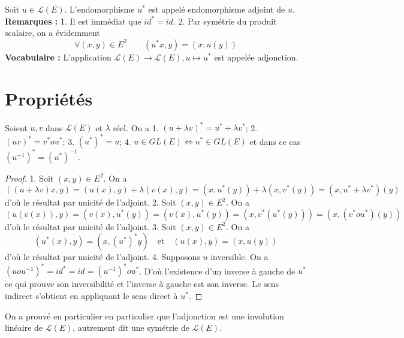 \begin{definition}
\label{def:1}

Soit $u \in \mathcal{L}(E)$. L'endomorphisme $u^*$ est appelé endomorphisme adjoint de $u$.
\textbf{Remarques :} 1. Il est immédiat que $id^* = id$.
2. Par symétrie du produit scalaire, on a évidemment
\[ \forall (x,y) \in E^2 \qquad (u^*x, y) = (x, u(y)) \]
\textbf{Vocabulaire :} L'application $\mathcal{L}(E) \to \mathcal{L}(E), u \mapsto u^*$ est appelée adjonction.

\end{definition}

\section{Propriétés}

\begin{proposition}
\label{prop:1}

Soient $u, v$ dans $\mathcal{L}(E)$ et $\lambda$ réel. On a
1. $(u + \lambda v)^* = u^* + \lambda v^*$;
2. $(uv)^* = v^*o u^*$;
3. $(u^*)^* = u$;
4. $u \in GL(E) \iff u^* \in GL(E)$ et dans ce cas $(u^{-1})^* = (u^*)^{-1}$.

\end{proposition}

\begin{proof}

1. Soit $(x,y) \in E^2$. On a
\[ ((u + \lambda v)x, y) = (u(x), y) + \lambda (v(x), y) = (x, u^*(y)) + \lambda (x, v^*(y)) = (x, u^* + \lambda v^*)(y) \]
d'où le résultat par unicité de l'adjoint.
2. Soit $(x,y) \in E^2$. On a
\[ (u(v(x)), y) = (v(x), u^*(y)) = (v(x), u^*(y)) = (x, v^* (u^*(y))) = (x, (v^*o u^*)(y)) \]
d'où le résultat par unicité de l'adjoint.
3. Soit $(x,y) \in E^2$. On a
\[ (u^*(x), y) = (x, (u^*)^*y) \quad \text{et} \quad (u(x), y) = (x, u(y)) \]
d'où le résultat par unicité de l'adjoint.
4. Supposons $u$ inversible. On a $(uou^{-1})^* = id^* = id = (u^{-1})^*o u^*$. D'où l'existence d'un inverse à gauche de $u^*$ ce qui prouve son inversibilité et l'inverse à gauche est son inverse. Le sens indirect s'obtient en appliquant le sens direct à $u^*$.

\end{proof}

\begin{remark}

On a prouvé en particulier en particulier que l'adjonction est une involution linéaire de $\mathcal{L}(E)$, autrement dit une symétrie de $\mathcal{L}(E)$.

\end{remark}

